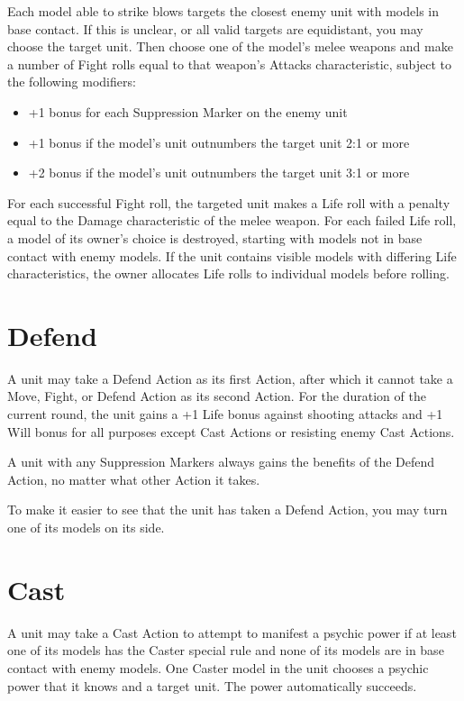 \begin{multicols}{2}
Each model able to strike blows targets the closest enemy unit with models in base contact. If this is unclear, or all valid targets are equidistant, you may choose the target unit. Then choose one of the model's melee weapons and make a number of Fight rolls equal to that weapon's Attacks characteristic, subject to the following modifiers:

\begin{itemize}
 \item +1 bonus for each Suppression Marker on the enemy unit
 \item +1 bonus if the model's unit outnumbers the target unit 2:1 or more
 \item +2 bonus if the model's unit outnumbers the target unit 3:1 or more
\end{itemize}

For each successful Fight roll, the targeted unit makes a Life roll with a penalty equal to the Damage characteristic of the melee weapon. For each failed Life roll, a model of its owner's choice is destroyed, starting with models not in base contact with enemy models. If the unit contains visible models with differing Life characteristics, the owner allocates Life rolls to individual models before rolling.




\section*{Defend}
A unit may take a Defend Action as its first Action, after which it cannot take a Move, Fight, or Defend Action as its second Action. For the duration of the current round, the unit gains a +1 Life bonus against shooting attacks and +1 Will bonus for all purposes except Cast Actions or resisting enemy Cast Actions.

A unit with any Suppression Markers always gains the benefits of the Defend Action, no matter what other Action it takes.

To make it easier to see that the unit has taken a Defend Action, you may turn one of its models on its side.




\section*{Cast}
A unit may take a Cast Action to attempt to manifest a psychic power if at least one of its models has the Caster special rule and none of its models are in base contact with enemy models. One Caster model in the unit chooses a psychic power that it knows and a target unit. The power automatically succeeds.


\end{multicols}
